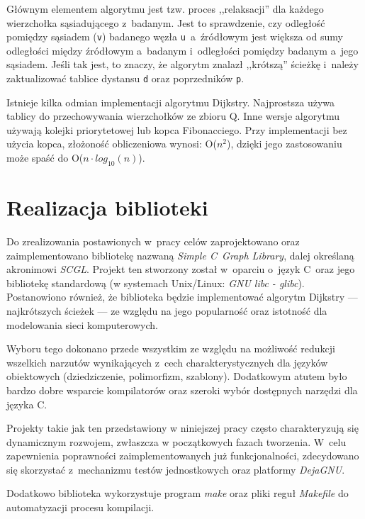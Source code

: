 \documentclass[a4paper,12pt,polish,oneside,openright]{thesis}
\newcommand\code[1]{\lstinline[style=line]{#1}}
\begin{document}
Głównym elementem algorytmu jest tzw. proces ,,relaksacji'' dla każdego wierzchołka sąsiadującego z~badanym.
Jest to sprawdzenie, czy odległość pomiędzy sąsiadem (\code{v}) badanego węzła \code{u}~a~źródłowym jest większa od sumy odległości między źródłowym a~badanym i~odległości pomiędzy badanym a~jego sąsiadem.
Jeśli tak jest, to znaczy, że algorytm znalazł ,,krótszą'' ścieżkę i~należy zaktualizować tablice dystansu \code{d} oraz poprzedników \code{p}.

Istnieje kilka odmian implementacji algorytmu Dijkstry.
Najprostsza używa tablicy do przechowywania wierzchołków ze zbioru Q.
Inne wersje algorytmu używają kolejki priorytetowej lub kopca Fibonacciego.
Przy implementacji bez użycia kopca, złożoność obliczeniowa wynosi: O($n^2$), dzięki jego zastosowaniu może spaść do O($n \cdot log_{10}(n)$)\cite{graphtheory2}.


\chapter{Realizacja biblioteki}
Do zrealizowania postawionych w~pracy celów zaprojektowano oraz zaimplementowano bibliotekę nazwaną \emph{Simple C~Graph Library}, dalej określaną akronimowi \emph{SCGL}.
Projekt ten stworzony został w~oparciu o~język C~oraz jego bibliotekę standardową (w systemach Unix/Linux: \emph{GNU libc - glibc}).
Postanowiono również, że biblioteka będzie implementować algorytm Dijkstry --- najkrótszych ścieżek --- ze względu na jego popularność oraz istotność dla modelowania sieci komputerowych.

Wyboru tego dokonano przede wszystkim ze względu na możliwość redukcji wszelkich narzutów wynikających z~cech charakterystycznych dla języków obiektowych (dziedziczenie, polimorfizm, szablony).
Dodatkowym atutem było bardzo dobre wsparcie kompilatorów oraz szeroki wybór dostępnych narzędzi dla języka C.

Projekty takie jak ten przedstawiony w niniejszej pracy często charakteryzują się dynamicznym rozwojem, zwłaszcza w początkowych fazach tworzenia.
W~celu zapewnienia poprawności zaimplementowanych już funkcjonalności, zdecydowano się skorzystać z~mechanizmu testów jednostkowych oraz platformy \emph{DejaGNU}.

Dodatkowo biblioteka wykorzystuje program \emph{make} oraz pliki reguł \emph{Makefile} do automatyzacji procesu kompilacji.
\end{document}

